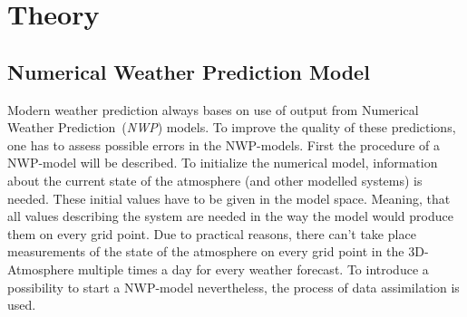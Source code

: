 \chapter{Theory}
\setcounter{page}{1}
\section{Numerical Weather Prediction Model}
\p
Modern weather prediction always bases on use of output from Numerical Weather Prediction~(\emph{NWP}) models. To improve the quality of these predictions, one has to assess possible errors in the NWP-models. First the procedure of a NWP-model will be described.\cite{grandy2004time}
\p
To initialize the numerical model, information about the current state of the atmosphere (and other modelled systems) is needed. These initial values have to be given in the \glqq model space\grqq. Meaning, that all values describing the system are needed in the way the model would produce them on every grid point.
\p
Due to practical reasons, there can't take place measurements of the state of the atmosphere on every grid point in the 3D-Atmosphere multiple times a day for every weather forecast. To introduce a possibility to start a NWP-model nevertheless, the process of data assimilation is used.
